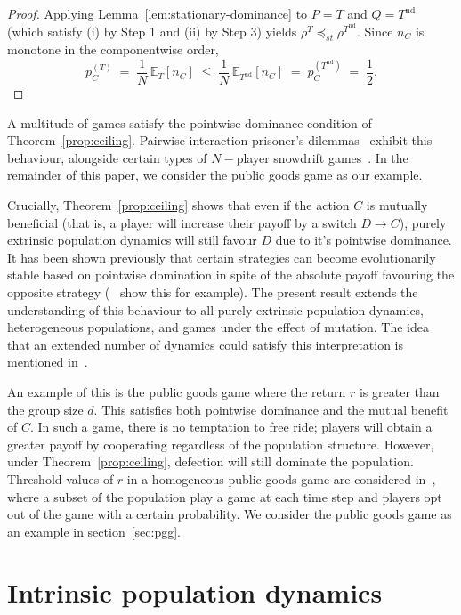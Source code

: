 \documentclass{article}
\begin{document}
\begin{proof}
    \medskip
    Applying Lemma~\ref{lem:stationary-dominance} to \(P = T\) and \(Q =
    T^{\mathrm{nd}}\) (which satisfy (i) by Step 1 and (ii) by Step 3) yields
    \(\rho^T \preceq_{st} \rho^{T^{\mathrm{nd}}}\). Since \(n_C\) is monotone in the
    componentwise order,
    \[
        p_C^{(T)} \;=\; \frac{1}{N}\, \mathbb{E}_T[n_C]
        \;\leq\; \frac{1}{N}\, \mathbb{E}_{T^{\mathrm{nd}}}[n_C]
        \;=\; p_C^{(T^{\mathrm{nd}})} \;=\; \frac{1}{2}.
    \]
\end{proof}

A multitude of games satisfy the pointwise-dominance condition of
Theorem~\ref{prop:ceiling}. Pairwise interaction prisoner's
dilemmas~\cite{traulsen_pairwise_2007} exhibit this behaviour, alongside certain
types of \(N-\)player snowdrift games~\cite{souza_evolution_2009}. In the
remainder of this paper, we consider the public goods game as our example.

Crucially, Theorem~\ref{prop:ceiling} shows that even if the action \(C\) is
mutually beneficial (that is, a player will increase their payoff by a switch
\(D \to C\)), purely extrinsic population dynamics will still favour \(D\) due
to it's pointwise dominance. It has been shown previously that certain
strategies can become evolutionarily stable based on pointwise domination in
spite of the absolute payoff favouring the opposite strategy
(~\cite{kurokawa_emergence_2009, Nowak2004Emergence} show this for example). The
present result extends the understanding of this behaviour to all purely
extrinsic population dynamics, heterogeneous populations, and games under the
effect of mutation. The idea that an extended number of dynamics could satisfy
this interpretation is mentioned in~\cite{Nowak2004Emergence}.

An example of this is the public goods game where the return \(r\) is greater
than the group size \(d\). This satisfies both pointwise dominance and the
mutual benefit of \(C\). In such a game, there is no temptation to free ride;
players will obtain a greater payoff by cooperating regardless of the population
structure. However, under Theorem~\ref{prop:ceiling}, defection will still
dominate the population. Threshold values of \(r\) in a homogeneous public goods
game are considered in~\cite{g10010001}, where a subset of the population play a
game at each time step and players opt out of the game with a certain
probability. We consider the public goods game as an example in
section~\ref{sec:pgg}.

\section{Intrinsic population dynamics}
\label{sec:intrinsic_population_dynamics}
\end{document}
